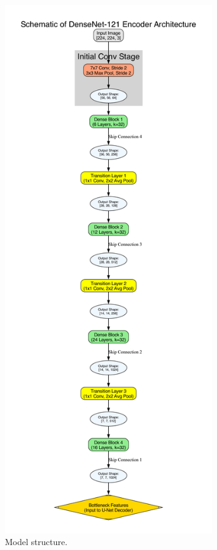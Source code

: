 \documentclass[../main.tex]{subfiles}
\begin{document}
\begin{figure}[h!] %
    \centering %
    \includegraphics[width=0.8\textwidth]{densenet121_structure.pdf} %
    \caption{Model structure.} %
    \label{fig:my_pdf_graph} %
\end{figure}


\cite{}
\end{document}

